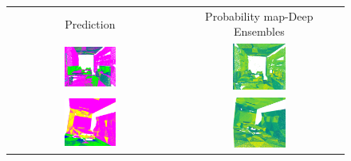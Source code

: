     \begin{figure}[h!]
        \centering
        \begin{tabular}{cc}
            Prediction & Probability map-Deep Ensembles \\
            \includegraphics[width=0.33\textwidth, height=0.18\textheight]{images/seg_output/s3dis_DE/S3DIS_1_Pred.png}& 
            \includegraphics[width=0.33\textwidth, height=0.18\textheight]{images/seg_output/s3dis_DE/S3DIS_1_prob.png}\\

            \includegraphics[width=0.33\textwidth, height=0.18\textheight]{images/seg_output/s3dis_DE/S3DIS_2_Pred.png}& 
            \includegraphics[width=0.33\textwidth, height=0.18\textheight]{images/seg_output/s3dis_DE/S3DIS_2_prob.png}\\


\end{tabular}
\end{figure}

